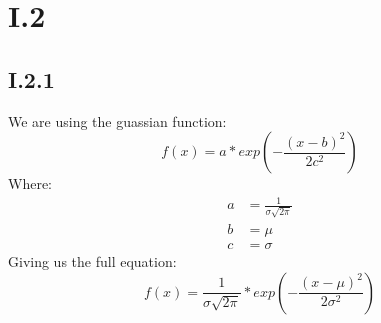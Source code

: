 \documentclass{article}
\begin{document}
\section{I.2}

\subsection{I.2.1}

We are using the guassian function:
\begin{equation}
    f(x) = a * exp\left(-\frac{(x-b)^2}{2c^2}\right)
\end{equation}
Where:
\begin{align*}
    a &= \frac{1}{\sigma \sqrt{2\pi}}\\
    b &= \mu\\
    c &= \sigma 
\end{align*}
Giving us the full equation:
\begin{equation}
    f(x) = \frac{1}{\sigma \sqrt{2\pi}} * exp\left(-\frac{(x-\mu)^2}{2\sigma^2}\right)
\end{equation}
\end{document}
